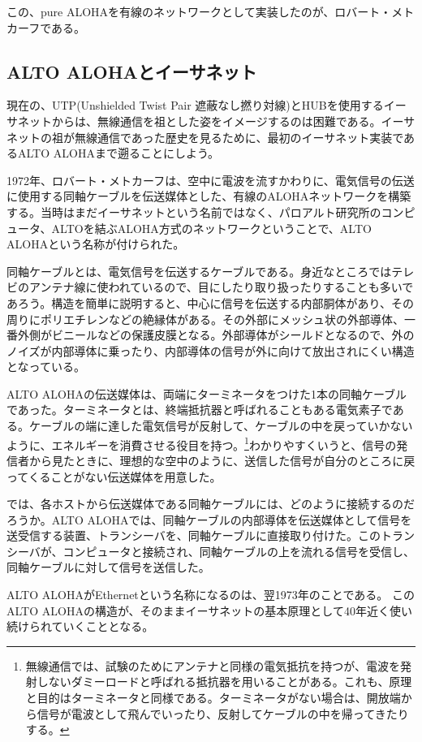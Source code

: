 この、pure ALOHAを有線のネットワークとして実装したのが、ロバート・メトカーフである。

\subsection{ALTO ALOHAとイーサネット}

現在の、UTP(Unshielded Twist Pair 遮蔽なし撚り対線)とHUBを使用するイーサネットからは、無線通信を祖とした姿をイメージするのは困難である。イーサネットの祖が無線通信であった歴史を見るために、最初のイーサネット実装であるALTO ALOHAまで遡ることにしよう。

1972年、ロバート・メトカーフは、空中に電波を流すかわりに、電気信号の伝送に使用する同軸ケーブルを伝送媒体とした、有線のALOHAネットワークを構築する。当時はまだイーサネットという名前ではなく、パロアルト研究所のコンピュータ、ALTOを結ぶALOHA方式のネットワークということで、ALTO ALOHAという名称が付けられた。

同軸ケーブルとは、電気信号を伝送するケーブルである。身近なところではテレビのアンテナ線に使われているので、目にしたり取り扱ったりすることも多いであろう。構造を簡単に説明すると、中心に信号を伝送する内部胴体があり、その周りにポリエチレンなどの絶縁体がある。その外部にメッシュ状の外部導体、一番外側がビニールなどの保護皮膜となる。外部導体がシールドとなるので、外のノイズが内部導体に乗ったり、内部導体の信号が外に向けて放出されにくい構造となっている。

ALTO ALOHAの伝送媒体は、両端にターミネータをつけた1本の同軸ケーブルであった。ターミネータとは、終端抵抗器と呼ばれることもある電気素子である。ケーブルの端に達した電気信号が反射して、ケーブルの中を戻っていかないように、エネルギーを消費させる役目を持つ。\footnote{無線通信では、試験のためにアンテナと同様の電気抵抗を持つが、電波を発射しないダミーロードと呼ばれる抵抗器を用いることがある。これも、原理と目的はターミネータと同様である。ターミネータがない場合は、開放端から信号が電波として飛んでいったり、反射してケーブルの中を帰ってきたりする。}わかりやすくいうと、信号の発信者から見たときに、理想的な空中のように、送信した信号が自分のところに戻ってくることがない伝送媒体を用意した。

では、各ホストから伝送媒体である同軸ケーブルには、どのように接続するのだろうか。ALTO ALOHAでは、同軸ケーブルの内部導体を伝送媒体として信号を送受信する装置、トランシーバを、同軸ケーブルに直接取り付けた。このトランシーバが、コンピュータと接続され、同軸ケーブルの上を流れる信号を受信し、同軸ケーブルに対して信号を送信した。

ALTO ALOHAがEthernetという名称になるのは、翌1973年のことである。
このALTO ALOHAの構造が、そのままイーサネットの基本原理として40年近く使い続けられていくこととなる。

